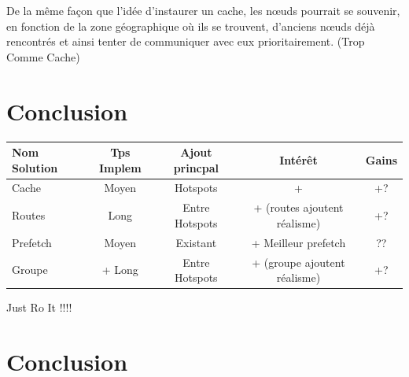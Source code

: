 \documentclass[11pt,a4paper]{article}
\begin{document}
\par De la même façon que l'idée d'instaurer un cache, les nœuds pourrait se souvenir, en fonction de la zone géographique où ils se trouvent, d'anciens nœuds déjà rencontrés et ainsi tenter de communiquer avec eux prioritairement. (Trop Comme Cache)

\section{Conclusion}

\vspace{1cm}
\begin{tabular}{|l|c|c|c|c|}
\hline
Nom Solution & Tps Implem & Ajout princpal & Intérêt & Gains \\
\hline
Cache & Moyen & Hotspots & + & +? \\
Routes & Long & Entre Hotspots & + (routes ajoutent réalisme) & +?\\
Prefetch & Moyen & Existant & + Meilleur prefetch & ??\\
Groupe & + Long & Entre Hotspots & + (groupe ajoutent réalisme) & +?\\
\hline
\end{tabular}
\vspace{1cm}

\par Just Ro It !!!!

\section{Conclusion}


\newpage




 
\end{document}
